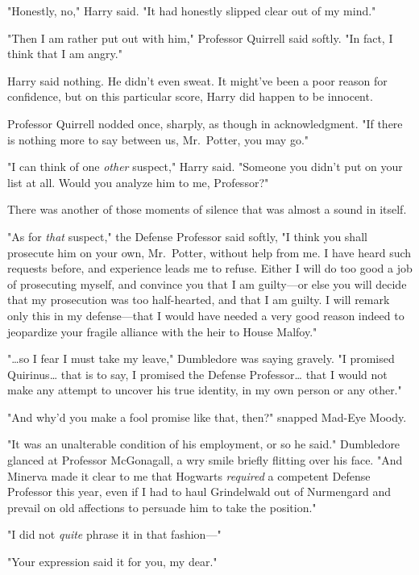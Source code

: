 "Honestly, no," Harry said. "It had honestly slipped clear out of my mind."

"Then I am rather put out with him," Professor Quirrell said softly. "In fact,
I think that I am angry."

Harry said nothing. He didn't even sweat. It might've been a poor reason for
confidence, but on this particular score, Harry did happen to be innocent.

Professor Quirrell nodded once, sharply, as though in acknowledgment. "If there
is nothing more to say between us, Mr.~Potter, you may go."

"I can think of one \emph{other} suspect," Harry said. "Someone you didn't put
on your list at all. Would you analyze him to me, Professor?"

There was another of those moments of silence that was almost a sound in itself.

"As for \emph{that} suspect," the Defense Professor said softly, "I think you
shall prosecute him on your own, Mr.~Potter, without help from me. I have heard
such requests before, and experience leads me to refuse. Either I will do too
good a job of prosecuting myself, and convince you that I am guilty---or else
you will decide that my prosecution was too half-hearted, and that I am guilty.
I will remark only this in my defense---that I would have needed a very good
reason indeed to jeopardize your fragile alliance with the heir to House
Malfoy."

"{\ldots}so I fear I must take my leave," Dumbledore was saying gravely. "I
promised Quirinus{\ldots} that is to say, I promised the Defense
Professor{\ldots} that I would not make any attempt to uncover his true
identity, in my own person or any other."

"And why'd you make a fool promise like that, then?" snapped Mad-Eye Moody.

"It was an unalterable condition of his employment, or so he said." Dumbledore
glanced at Professor McGonagall, a wry smile briefly flitting over his face.
"And Minerva made it clear to me that Hogwarts \emph{required} a competent
Defense Professor this year, even if I had to haul Grindelwald out of
Nurmengard and prevail on old affections to persuade him to take the position."

"I did not \emph{quite} phrase it in that fashion---"

"Your expression said it for you, my dear."

